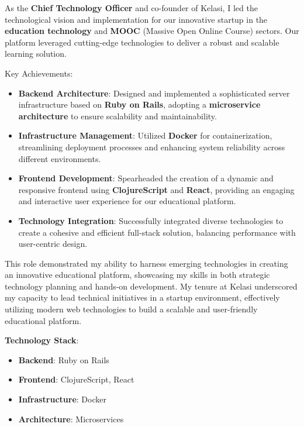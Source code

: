 \vfill
\divider
\vfill

As the \textbf{Chief Technology Officer} and co-founder of Kelasi, I led the technological vision and implementation for our innovative startup in the \textbf{education technology} and \textbf{MOOC} (Massive Open Online Course) sectors. Our platform leveraged cutting-edge technologies to deliver a robust and scalable learning solution.

Key Achievements:
\begin{itemize}
    \item \textbf{Backend Architecture}: Designed and implemented a sophisticated server infrastructure based on \textbf{Ruby on Rails}, adopting a \textbf{microservice architecture} to ensure scalability and maintainability.
    
    \item \textbf{Infrastructure Management}: Utilized \textbf{Docker} for containerization, streamlining deployment processes and enhancing system reliability across different environments.
    
    \item \textbf{Frontend Development}: Spearheaded the creation of a dynamic and responsive frontend using \textbf{ClojureScript} and \textbf{React}, providing an engaging and interactive user experience for our educational platform.
    
    \item \textbf{Technology Integration}: Successfully integrated diverse technologies to create a cohesive and efficient full-stack solution, balancing performance with user-centric design.
\end{itemize}

This role demonstrated my ability to harness emerging technologies in creating an innovative educational platform, showcasing my skills in both strategic technology planning and hands-on development. My tenure at Kelasi underscored my capacity to lead technical initiatives in a startup environment, effectively utilizing modern web technologies to build a scalable and user-friendly educational platform.

\smallskip
\textbf{Technology Stack}:
\begin{itemize}
    \item \textbf{Backend}: Ruby on Rails
    \item \textbf{Frontend}: ClojureScript, React
    \item \textbf{Infrastructure}: Docker
    \item \textbf{Architecture}: Microservices
\end{itemize}

